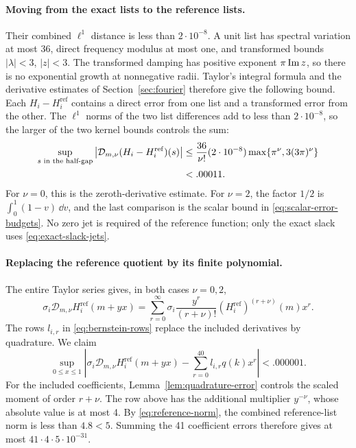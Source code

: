 \paragraph{Moving from the exact lists to the reference lists.}
Their combined \(\ell^1\) distance is less than \(2\cdot10^{-8}\).  A unit
list has spectral variation at most 36, direct frequency modulus at most one,
and transformed bounds \(|\lambda|<3\), \(|z|<3\).  The transformed damping
has positive exponent \(\pi\operatorname{Im} z\), so there is no exponential growth at
nonnegative radii.  Taylor's integral formula and the derivative estimates of
Section~\ref{sec:fourier} therefore give the following bound.  Each
\(H_i-H_i^{\mathrm{ref}}\) contains a direct error from one list and a
transformed error from the other.  The \(\ell^1\) norms of the two list
differences add to less than \(2\cdot10^{-8}\), so the larger of the two
kernel bounds controls the sum:
\begin{align}
 \sup_{s\text{ in the half-gap}}
 \left|\mathcal D_{m,\nu}(H_i-H_i^{\mathrm{ref}})(s)\right|
 &\le\frac{36}{\nu!}(2\cdot10^{-8})
       \max\{\pi^\nu,3(3\pi)^\nu\}\notag\\
 &<.00011.\label{eq:deleted-list-error}
\end{align}
For \(\nu=0\), this is the zeroth-derivative estimate.  For \(\nu=2\), the
factor \(1/2\) is \(\int_0^1(1-v)\,\dd v\), and the last comparison is the
scalar bound in \eqref{eq:scalar-error-budgets}.  No zero jet is required of
the reference function; only the exact slack uses \eqref{eq:exact-slack-jets}.

\paragraph{Replacing the reference quotient by its finite polynomial.}
The entire Taylor series gives, in both cases \(\nu=0,2\),
\[
 \sigma_i\mathcal D_{m,\nu}H_i^{\mathrm{ref}}(m+yx)
 =\sum_{r=0}^{\infty}
   \sigma_i\frac{y^r}{(r+\nu)!}
     (H_i^{\mathrm{ref}})^{(r+\nu)}(m)x^r.
\]
The rows \(l_{i,r}\) in \eqref{eq:bernstein-rows} replace the included
derivatives by quadrature.  We claim
\begin{equation}\label{eq:half-gap-polynomial-error}
 \sup_{0\le x\le1}
 \left|\sigma_i\mathcal D_{m,\nu}H_i^{\mathrm{ref}}(m+yx)
       -\sum_{r=0}^{40}l_{i,r}q(k)x^r\right|<.000001.
\end{equation}
For the included coefficients, Lemma~\ref{lem:quadrature-error} controls the
scaled moment of order \(r+\nu\).  The row above has the additional multiplier
\(y^{-\nu}\), whose absolute value is at most 4.  By
\eqref{eq:reference-norm}, the combined reference-list norm is less than
\(4.8<5\).  Summing the 41 coefficient errors therefore gives at most
\(41\cdot4\cdot5\cdot10^{-31}\).

